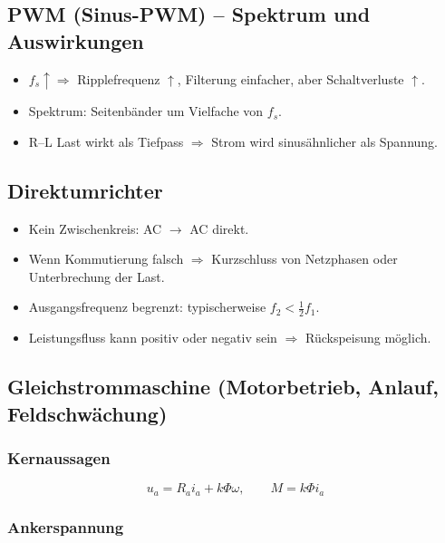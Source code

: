 \subsection{PWM (Sinus-PWM) – Spektrum und Auswirkungen}

\begin{itemize}
\item $f_s\uparrow \Rightarrow$ Ripplefrequenz $\uparrow$, Filterung einfacher, aber Schaltverluste $\uparrow$.
\item Spektrum: Seitenbänder um Vielfache von $f_s$.
\item R--L Last wirkt als Tiefpass $\Rightarrow$ Strom wird sinusähnlicher als Spannung.
\end{itemize}

\subsection{Direktumrichter}

\begin{itemize}
\item Kein Zwischenkreis: AC $\rightarrow$ AC direkt.
\item Wenn Kommutierung falsch $\Rightarrow$ Kurzschluss von Netzphasen oder Unterbrechung der Last.
\item Ausgangsfrequenz begrenzt: typischerweise $f_2 < \frac{1}{2}f_1$.
\item Leistungsfluss kann positiv oder negativ sein $\Rightarrow$ Rückspeisung möglich.
\end{itemize}

\subsection{Gleichstrommaschine (Motorbetrieb, Anlauf, Feldschwächung)}

\subsubsection{Kernaussagen}

\[
u_a = R_a i_a + k\Phi \omega,\qquad M=k\Phi i_a
\]

\subsubsection{Ankerspannung}


